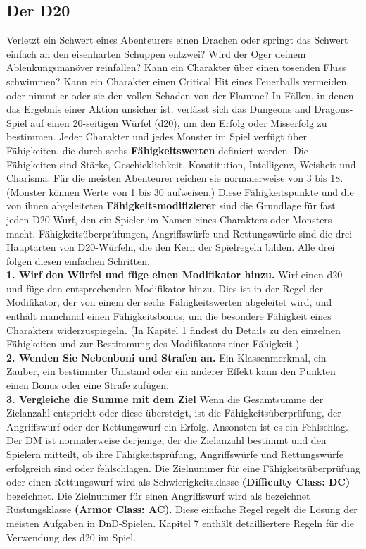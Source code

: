 \subsection{Der D20}
Verletzt ein Schwert eines Abenteurers einen Drachen oder springt das Schwert einfach an den eisenharten Schuppen entzwei? Wird der Oger deinem Ablenkungsmanöver reinfallen? Kann ein Charakter über einen tosenden Fluss schwimmen? Kann ein Charakter einen Critical Hit eines Feuerballs vermeiden, oder nimmt er oder sie den vollen Schaden von der Flamme? In Fällen, in denen das Ergebnis einer Aktion unsicher ist, verlässt sich das Dungeons and Dragons-Spiel auf einen 20-seitigen Würfel (d20), um den Erfolg oder Misserfolg zu bestimmen.
Jeder Charakter und jedes Monster im Spiel verfügt über Fähigkeiten, die durch sechs \textbf{Fähigkeitswerten} definiert werden. Die Fähigkeiten sind Stärke, Geschicklichkeit, Konstitution, Intelligenz, Weisheit und Charisma. Für die meisten Abenteurer reichen sie normalerweise von 3 bis 18. (Monster können Werte von 1 bis 30 aufweisen.) Diese Fähigkeitspunkte und die von ihnen abgeleiteten \textbf{Fähigkeitsmodifizierer} sind die Grundlage für fast jeden D20-Wurf, den ein Spieler im Namen eines Charakters oder Monsters macht. Fähigkeitsüberprüfungen, Angriffswürfe und Rettungswürfe sind die drei Hauptarten von D20-Würfeln, die den Kern der Spielregeln bilden. Alle drei folgen diesen einfachen Schritten.\\
\textbf{1. Wirf den Würfel und füge einen Modifikator hinzu.}
Wirf einen d20 und füge den entsprechenden Modifikator hinzu. Dies ist in der Regel der Modifikator, der von einem der sechs Fähigkeitswerten abgeleitet wird, und enthält manchmal einen Fähigkeitsbonus, um die besondere Fähigkeit eines Charakters widerzuspiegeln. (In Kapitel 1 findest du Details zu den einzelnen Fähigkeiten und zur Bestimmung des Modifikators einer Fähigkeit.)\\
\textbf{2. Wenden Sie Nebenboni und Strafen an.} Ein Klassenmerkmal, ein Zauber, ein bestimmter Umstand oder ein anderer Effekt kann den Punkten einen Bonus oder eine Strafe zufügen.\\
\textbf{3. Vergleiche die Summe mit dem Ziel} Wenn die Gesamtsumme der Zielanzahl entspricht oder diese übersteigt, ist die Fähigkeitsüberprüfung, der Angriffswurf oder der Rettungswurf ein Erfolg. Ansonsten ist es ein Fehlschlag. Der DM ist normalerweise derjenige, der die Zielanzahl bestimmt und den Spielern mitteilt, ob ihre Fähigkeitsprüfung, Angriffswürfe und Rettungswürfe erfolgreich sind oder fehlschlagen. Die Zielnummer für eine Fähigkeitsüberprüfung oder einen Rettungswurf wird als Schwierigkeitsklasse \textbf{(Difficulty Class: DC)} bezeichnet. Die Zielnummer für einen Angriffswurf wird als bezeichnet
Rüstungsklasse \textbf{(Armor Class: AC)}. Diese einfache Regel regelt die Lösung der meisten Aufgaben in DnD-Spielen. Kapitel 7 enthält detailliertere Regeln für die Verwendung des d20 im Spiel.
